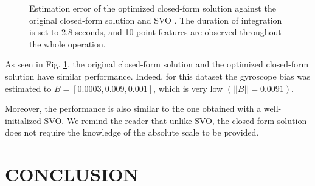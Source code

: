 \documentclass[letterpaper, 10 pt, conference]{ieeeconf}  %
\begin{document}
\begin{figure}
   \centering
   \resizebox{0.7\columnwidth}{!}{}
   \caption{Estimation error of the optimized closed-form solution against the original closed-form solution \cite{Martinelli2014} and SVO \cite{Forster2014}. The duration of integration is set to 2.8 seconds, and 10 point features are observed throughout the whole operation.\label{fig:valid}}
\end{figure}

As seen in Fig. \ref{fig:valid}, the original closed-form solution and the optimized closed-form solution have similar performance.
Indeed, for this dataset the gyroscope bias was estimated to $B = [0.0003, 0.009, 0.001]$, which is very low $(||B|| = 0.0091)$.

Moreover, the performance is also similar to the one obtained with a well-initialized SVO.
We remind the reader that unlike SVO, the closed-form solution does not require the knowledge of the absolute scale to be provided.






\section{CONCLUSION}

\end{document}
